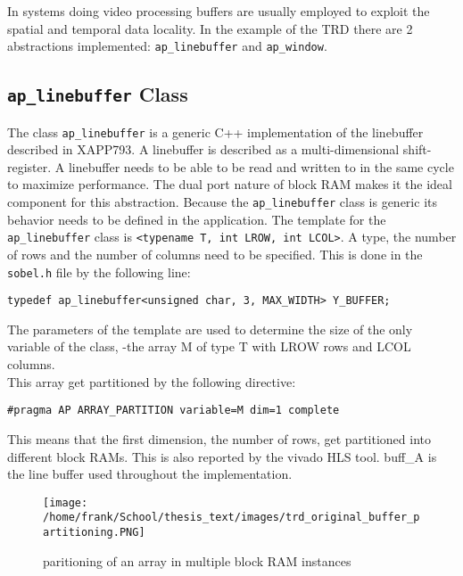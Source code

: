 \documentclass[../thesis.tex]{subfiles}
\begin{document}
In systems doing video processing buffers are usually employed to exploit the spatial and temporal data locality. In the example of the TRD there are 2 abstractions implemented: \texttt{ap\_linebuffer} and \texttt{ap\_window}.

\subsection{\texttt{ap\_linebuffer} Class}

The class \texttt{ap\_linebuffer} is a generic C++ implementation of the linebuffer described in XAPP793. A linebuffer is described as a multi-dimensional shift-register. A linebuffer needs to be able to be read and written to in the same cycle to maximize performance. The dual port nature of block RAM makes it the ideal component for this abstraction.
Because the \texttt{ap\_linebuffer} class is generic its behavior needs to be defined in the application. The template for the \texttt{ap\_linebuffer} class is \texttt{<typename T, int LROW, int LCOL>}. A type, the number of rows and the number of columns need to be specified. This is done in the \texttt{sobel.h} file by the following line:

\begin{verbatim}
typedef ap_linebuffer<unsigned char, 3, MAX_WIDTH> Y_BUFFER;
\end{verbatim}

The parameters of the template are used to determine the size of the only variable of the class, -the array M of type T with LROW rows and LCOL columns.\\
This array get partitioned by the following directive:

\begin{verbatim}
#pragma AP ARRAY_PARTITION variable=M dim=1 complete
\end{verbatim}

This means that the first dimension, the number of rows, get partitioned into different block RAMs. This is also reported by the vivado HLS tool. buff\_A is the line buffer used throughout the implementation.\\

\medskip

\begin{figure}[h]
\centering
\texttt{[image: /home/frank/School/thesis\_text/images/trd\_original\_buffer\_partitioning.PNG]} 
\caption{paritioning of an array in multiple block RAM instances}
\end{figure}
\end{document}
